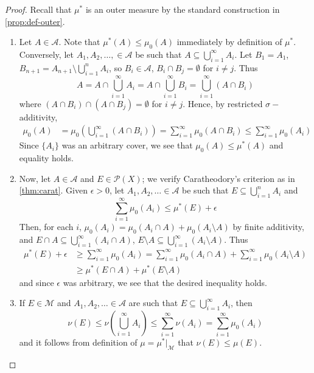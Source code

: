 \documentclass[11pt, a4paper]{memoir}
\theoremstyle{change}
\theoremstyle{plain}
\theoremstyle{nonumberplain}
\newtheorem{proof}{Proof}
\numberwithin{equation}{section}
\begin{document}
\begin{proof}
    Recall that $\mu^*$ is an outer measure by the standard construction in \cref{prop:def-outer}.
    \begin{enumerate}[r]
        \item Let $A\in\mathcal{A}$.
            Note that $\mu^*(A)\leq\mu_0(A)$ immediately by definition of $\mu^*$.
            Conversely, let $A_1,A_2,\ldots,\in\mathcal{A}$ be such that $A\subseteq\bigcup_{i=1}^\infty A_i$.
            Let $B_1=A_1$, $B_{n+1}=A_{n+1}\setminus\bigcup_{i=1}^n A_i$, so $B_i\in\mathcal{A}$, $B_i\cap B_j=\emptyset$ for $i\neq j$.
            Thus
            \begin{equation*}
                A=A\cap\bigcup_{i=1}^\infty A_i=A\cap\bigcup_{i=1}^\infty B_i=\bigcup_{i=1}^\infty(A\cap B_i)
            \end{equation*}
            where $(A\cap B_i)\cap(A\cap B_j)=\emptyset$ for $i\neq j$.
            Hence, by restricted $\sigma-$additivity,
            \begin{align*}
                \mu_0(A) &= \mu_0\left(\bigcup_{i=1}^\infty(A\cap B_i)\right)=\sum\limits_{i=1}^\infty\mu_0(A\cap B_i)\leq\sum\limits_{i=1}^\infty\mu_0(A_i)
            \end{align*}
            Since $\{A_i\}$ was an arbitrary cover, we see that $\mu_0(A)\leq\mu^*(A)$ and equality holds.
        \item Now, let $A\in\mathcal{A}$ and $E\in\mathcal{P}(X)$; we verify Caratheodory's criterion as in \cref{thm:carat}.
            Given $\epsilon>0$, let $A_1,A_2,\ldots\in\mathcal{A}$ be such that $E\subseteq\bigcup_{i=1}^n A_i$ and
            \begin{equation*}
                \sum\limits_{i=1}^\infty \mu_0(A_i)\leq\mu^*(E)+\epsilon
            \end{equation*}
            Then, for each $i$, $\mu_0(A_i)=\mu_0(A_i\cap A)+\mu_0(A_i\setminus A)$ by finite additivity, and $E\cap A\subseteq\bigcup_{i=1}^\infty(A_i\cap A)$, $E\setminus A\subseteq\bigcup_{i=1}^\infty(A_i\setminus A)$.
            Thus
            \begin{align*}
                \mu^*(E)+\epsilon &\geq\sum\limits_{i=1}^\infty\mu_0(A_i)= \sum\limits_{i=1}^\infty \mu_0(A_i\cap A)+\sum\limits_{i=1}^\infty \mu_0(A_i\setminus A)\\
                                  &\geq \mu^*(E\cap A)+\mu^*(E\setminus A)
            \end{align*}
            and since $\epsilon$ was arbitrary, we see that the desired inequality holds.
        \item If $E\in\mathcal{M}$ and $A_1,A_2,\ldots\in\mathcal{A}$ are such that $E\subseteq\bigcup_{i=1}^\infty A_i$, then
            \begin{equation*}
                \nu(E)\leq\nu\left(\bigcup_{i=1}^\infty A_i\right)\leq\sum\limits_{i=1}^\infty \nu(A_i)=\sum\limits_{i=1}^\infty \mu_0(A_i)
            \end{equation*}
            and it follows from definition of $\mu=\mu^*|_{\mathcal{M}}$ that $\nu(E)\leq\mu(E)$.


\end{enumerate}
\end{proof}
\end{document}

